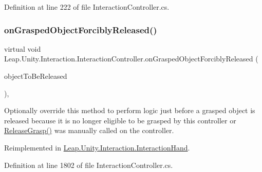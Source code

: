 Definition at line 222 of file Interaction\+Controller.\+cs.

\mbox{\label{class_leap_1_1_unity_1_1_interaction_1_1_interaction_controller_a9850539b1321c83e5a71c5e47eef6df1}} 
\subsubsection{\texorpdfstring{onGraspedObjectForciblyReleased()}{onGraspedObjectForciblyReleased()}}
{\footnotesize\ttfamily virtual void Leap.\+Unity.\+Interaction.\+Interaction\+Controller.\+on\+Grasped\+Object\+Forcibly\+Released (\begin{DoxyParamCaption}\item[{\mbox{\hyperlink{interface_leap_1_1_unity_1_1_interaction_1_1_i_interaction_behaviour}{I\+Interaction\+Behaviour}}}]{object\+To\+Be\+Released }\end{DoxyParamCaption})\hspace{0.3cm}{\ttfamily [protected]}, {\ttfamily [virtual]}}



Optionally override this method to perform logic just before a grasped object is released because it is no longer eligible to be grasped by this controller or \mbox{\hyperlink{class_leap_1_1_unity_1_1_interaction_1_1_interaction_controller_a3468a89e21c685d6df962ce70684c92f}{Release\+Grasp()}} was manually called on the controller. 



Reimplemented in \mbox{\hyperlink{class_leap_1_1_unity_1_1_interaction_1_1_interaction_hand_a1506a0d6e49010aedb6a8fe5a528d4fe}{Leap.\+Unity.\+Interaction.\+Interaction\+Hand}}.



Definition at line 1802 of file Interaction\+Controller.\+cs.

\mbox{\label{class_leap_1_1_unity_1_1_interaction_1_1_interaction_controller_a0798edd8ad92d6b7f6229e3d9ac26d07}} 
